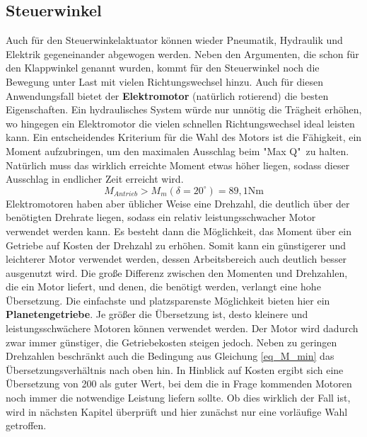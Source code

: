 \subsection{Steuerwinkel}
Auch für den Steuerwinkelaktuator können wieder Pneumatik, Hydraulik und Elektrik gegeneinander abgewogen werden. Neben den Argumenten, die schon für den Klappwinkel genannt wurden, kommt für den Steuerwinkel noch die Bewegung unter Last mit vielen Richtungswechsel hinzu. Auch für diesen Anwendungsfall bietet der \textbf{Elektromotor} (natürlich rotierend) die besten Eigenschaften. Ein hydraulisches System würde nur unnötig die Trägheit erhöhen, wo hingegen ein Elektromotor die vielen schnellen Richtungswechsel ideal leisten kann.
Ein entscheidendes Kriterium für die Wahl des Motors ist die Fähigkeit, ein Moment aufzubringen, um den maximalen Ausschlag beim "Max Q"\ zu halten. Natürlich muss das wirklich erreichte Moment etwas höher liegen, sodass dieser Ausschlag in endlicher Zeit erreicht wird.
\begin{equation}\label{eq_M_min}
	M_{Antrieb} > M_m(\delta = 20^\circ) = 89,1\mathrm{ Nm}
\end{equation}
Elektromotoren haben aber üblicher Weise eine Drehzahl, die deutlich über der benötigten Drehrate liegen, sodass ein relativ leistungsschwacher Motor verwendet werden kann. Es besteht dann die Möglichkeit, das Moment über ein Getriebe auf Kosten der Drehzahl zu erhöhen. Somit kann ein günstigerer und leichterer Motor verwendet werden, dessen Arbeitsbereich auch deutlich besser ausgenutzt wird. Die große Differenz zwischen den Momenten und Drehzahlen, die ein Motor liefert, und denen, die benötigt werden, verlangt eine hohe Übersetzung. Die einfachste und platzsparenste Möglichkeit bieten hier ein \textbf{Planetengetriebe}. Je größer die Übersetzung ist, desto kleinere und leistungsschwächere Motoren können verwendet werden. Der Motor wird dadurch zwar immer günstiger, die Getriebekosten steigen jedoch. Neben zu geringen Drehzahlen beschränkt auch die Bedingung aus Gleichung \ref{eq_M_min} das Übersetzungsverhältnis nach oben hin. In Hinblick auf Kosten ergibt sich eine Übersetzung von 200 als guter Wert, bei dem die in Frage kommenden Motoren noch immer die notwendige Leistung liefern sollte. Ob dies wirklich der Fall ist, wird in nächsten Kapitel überprüft und hier zunächst nur eine vorläufige Wahl getroffen.

